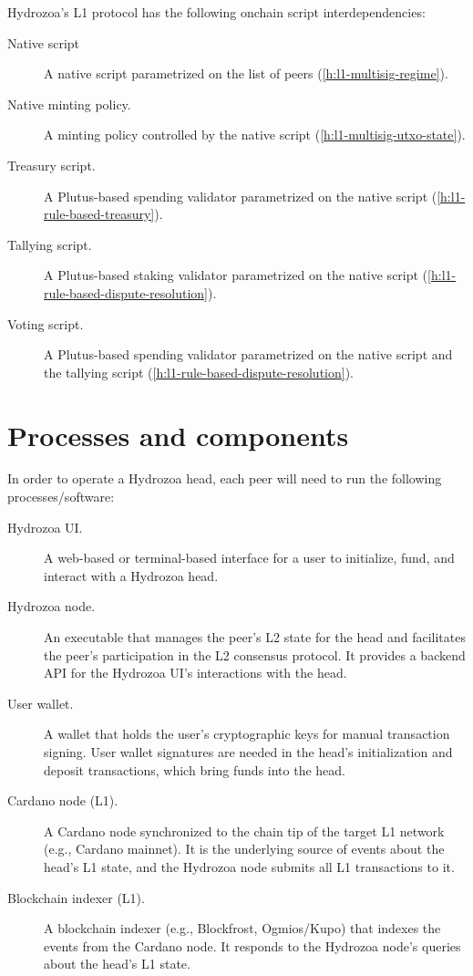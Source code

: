\documentclass[../hydrozoa.tex]{subfiles}
\begin{document}
Hydrozoa's L1 protocol has the following onchain script interdependencies:
\begin{description}
  \item[Native script] A native script parametrized on the list of peers (\cref{h:l1-multisig-regime}).
  \item[Native minting policy.] A minting policy controlled by the native script (\cref{h:l1-multisig-utxo-state}).
  \item[Treasury script.] A Plutus-based spending validator parametrized on the native script (\cref{h:l1-rule-based-treasury}).
  \item[Tallying script.] A Plutus-based staking validator parametrized on the native script (\cref{h:l1-rule-based-dispute-resolution}).
  \item[Voting script.] A Plutus-based spending validator parametrized on the native script and the tallying script (\cref{h:l1-rule-based-dispute-resolution}).
\end{description}

\section{Processes and components}%
\label{h:architecture-processes-and-components}%

In order to operate a Hydrozoa head, each peer will need to run the following processes/software:
\begin{description}
  \item[Hydrozoa UI.] A web-based or terminal-based interface for a user to initialize, fund, and interact with a Hydrozoa head.
  \item[Hydrozoa node.] An executable that manages the peer's L2 state for the head and facilitates the peer's participation in the L2 consensus protocol.
    It provides a backend API for the Hydrozoa UI's interactions with the head.
  \item[User wallet.] A wallet that holds the user's cryptographic keys for manual transaction signing.
    User wallet signatures are needed in the head's initialization and deposit transactions, which bring funds into the head.
  \item[Cardano node (L1).] A Cardano node synchronized to the chain tip of the target L1 network (e.g., Cardano mainnet).
    It is the underlying source of events about the head's L1 state, and the Hydrozoa node submits all L1 transactions to it.
  \item[Blockchain indexer (L1).] A blockchain indexer (e.g., Blockfrost, Ogmios/Kupo) that indexes the events from the Cardano node.
    It responds to the Hydrozoa node's queries about the head's L1 state.
\end{description}
\end{document}
